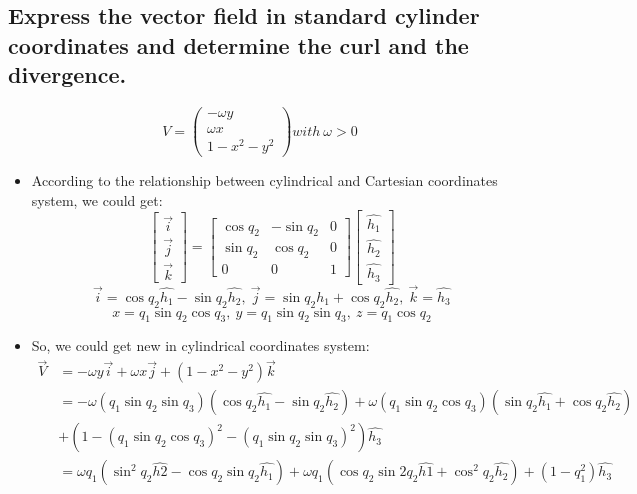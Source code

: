 \documentclass[12pt,a4paper]{article}
\begin{document}
\subsection{Express the vector field in standard cylinder coordinates and determine the curl and the divergence.}
\[V = 
\begin{pmatrix}
    -\omega y\\
    \omega x\\
    1 - x^2 - y^2
\end{pmatrix}
with\ \omega>0\]
\begin{itemize}
    \item According to the relationship between cylindrical and Cartesian coordinates system, we could get:\\
    \[\begin{bmatrix}
        \vec{i}\\
        \vec{j}\\
        \vec{k}
    \end{bmatrix} = 
    \begin{bmatrix}
        \cos{q_2} & -\sin{q_2} & 0\\
        \sin{q_2} & \cos{q_2} & 0\\
        0 & 0 & 1
    \end{bmatrix}
    \begin{bmatrix}
        \hat{h_1}\\
        \hat{h_2}\\
        \hat{h_3}
    \end{bmatrix}\]
    \[\vec{i} = \cos{q_2}\hat{h_1} - \sin{q_2}\hat{h_2},\ \vec{j} = \sin{q_2}\hat{h_1} + \cos{q_2}\hat{h_2},\ \vec{k} = \hat{h_3}\]
    \[x = q_1\sin{q_2}\cos{q_3},\ y = q_1\sin{q_2}\sin{q_3},\ z = q_1\cos{q_2}\]
    \item So, we could get new  in cylindrical coordinates system:
    \begin{equation}
    \begin{aligned}\vec{V} &= -\omega y\vec{i} + \omega x\vec{j}+(1 - x^2 -y^2)\vec{k}\\
    &= -\omega(q_1\sin{q_2}\sin{q_3})(\cos{q_2}\hat{h_1} - \sin{q_2}\hat{h_2}) + \omega(q_1\sin{q_2}\cos{q_3})(\sin{q_2}\hat{h_1} + \cos{q_2}\hat{h_2}) \\
    &+(1 - (q_1\sin{q_2}\cos{q_3})^2 - (q_1\sin{q_2}\sin{q_3})^2)\hat{h_3}\\
    &= \omega q_1(\sin^2q_2\hat{h2} - \cos{q_2}\sin{q_2}\hat{h_1}) + \omega q_1(\cos{q_2}\sin2q_2\hat{h1} + \cos^2q_2\hat{h_2}) +(1 - q_1^2)\hat{h_3}\\

\end{aligned}
\end{equation}
\end{itemize}
\end{document}
